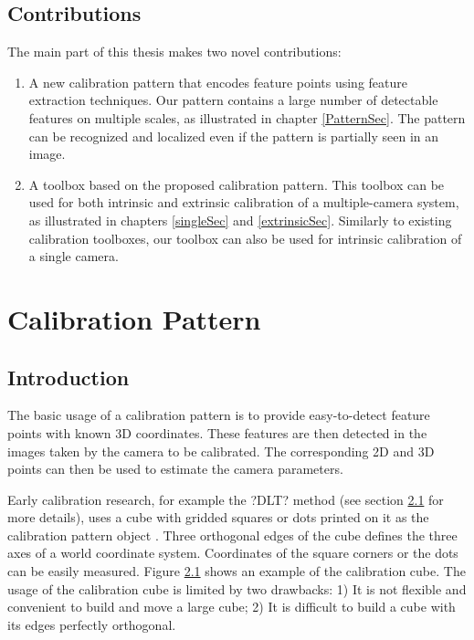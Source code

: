 \documentclass{report}
\begin{document}
\section{Contributions}

The main part of this thesis makes two novel contributions: 

\begin{enumerate}
\item A new calibration pattern that encodes feature points using feature extraction techniques. Our pattern contains a large number of detectable features on multiple scales, as illustrated in chapter \ref{PatternSec}. The pattern can be recognized and localized even if the pattern is partially seen in an image. 
\item A toolbox based on the proposed calibration pattern. This toolbox can be used for both intrinsic and extrinsic calibration of a multiple-camera system, as illustrated in chapters \ref{singleSec} and \ref{extrinsicSec}. Similarly to existing calibration toolboxes, our toolbox can also be used for intrinsic calibration of a single camera. 
\end{enumerate}

 

\chapter{Calibration Pattern}
\section{Introduction}
The basic usage of a calibration pattern is to provide easy-to-detect feature points with known 3D coordinates. These features are then detected in the images taken by the camera to be calibrated. The corresponding 2D and 3D points can then be used to estimate the camera parameters. 

Early calibration research, for example the ?DLT? method (see section \ref{} for more details), uses a cube with gridded squares or dots printed on it as the calibration pattern object \cite{}. Three orthogonal edges of the cube defines the three axes of a world coordinate system. Coordinates of the square corners or the dots can be easily measured. Figure \ref{} shows an example of the calibration cube. The usage of the calibration cube is limited by two drawbacks: 1) It is not flexible and convenient to build and move a large cube; 2) It is difficult to build a cube with its edges perfectly orthogonal. 
\end{document}
